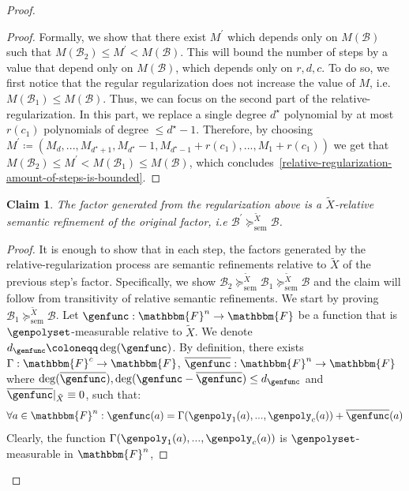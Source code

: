 \documentclass[10pt,a4paper]{article}
\newtheorem{claim}[theorem]{Claim}
\newcommand{\definedas}[0]{\coloneqq}
\newcommand{\basefield}[0]{\mathbbm{F}}
\newcommand{\blocklength}[0]{n}
\newcommand{\field}[0]{\basefield^{\blocklength}}
\newcommand{\degree}[0]{d}
\newcommand{\funcdef}[3]{#1:#2\rightarrow#3}
\newcommand{\restrictfunc}[2]{#1|_{#2}}
\newcommand{\factor}[0]{\mathcal{B}}
\newcommand{\relsemrefineex}[1]{\succeq^{#1}_{\text{sem}}}
\newcommand{\relativeremainder}[1]{\overline{#1}}
\newcommand{\variety}{{\tilde{X}}}
\newcommand{\rankfunc}[0]{{{{r}}}}
\begin{document}
\begin{proof}
\begin{proof}
        Formally, we show that there exist $M^{\prime}$ which depends only on $M(\factor)$ such that $M(\factor_2) \leq M^{\prime} < M(\factor)$.
        This will bound the number of steps by a value that depend only on $M(\factor)$, which depends only on $\rankfunc, \degree, c$.
        To do so, we first notice that the regular regularization does not increase the value of $M$, i.e. $M(\factor_1) \leq M(\factor)$.
        Thus, we can focus on the second part of the relative-regularization.
        In this part, we replace a single degree $\degree^{\star}$ polynomial by at most $\rankfunc(c_1)$ polynomials of degree $\leq \degree^{\star} - 1$.
        Therefore, by choosing $M^{\prime} \definedas (M_{\degree}, ..., M_{\degree^{\star}+1}, M_{\degree^{\star}}-1, M_{\degree^{\star}-1}+\rankfunc(c_1),...,M_1+\rankfunc(c_1))$
        we get that $M(\factor_2) \leq M^{\prime} < M(\factor_1) \leq M(\factor)$, which concludes~\ref{relative-regularization-amount-of-steps-is-bounded}.
    \end{proof}
    \begin{claim}
        The factor generated from the regularization above is a $\variety$-relative semantic refinement of the original factor, i.e $\factor^\prime \relsemrefineex{\variety} \factor$.
    \end{claim}
    \begin{proof}
        It is enough to show that in each step, the factors generated by the relative-regularization process are semantic refinements relative to $\variety$ of the previous step's factor.
        Specifically, we show $\factor_{2} \relsemrefineex{\variety} \factor_{1} \relsemrefineex{\variety} \factor$ and the claim will follow from transitivity of relative semantic refinements.
        \newline
        We start by proving $\factor_1 \relsemrefineex{\variety} \factor$.
        Let $\funcdef{\genfunc}{\field}{\basefield}$ be a function that is $\genpolyset$-measurable relative to $\variety$.
        We denote $\degree_{\genfunc} \definedas \deg(\genfunc)$.
        By definition, there exists $\funcdef{\Gamma}{\basefield^c}{\basefield}$,
        $\funcdef{\relativeremainder{\genfunc}}{\field}{\basefield}$ where $\deg(\relativeremainder{\genfunc}), \deg(\genfunc - \relativeremainder{\genfunc}) \leq \degree_{\genfunc}$ and $\restrictfunc{\relativeremainder{\genfunc}}{\variety} \equiv 0$, such that:
        \[
            \forall a \in \field: \genfunc(a) = \Gamma(\genpoly_1(a),...,\genpoly_c(a)) + \relativeremainder{\genfunc}(a)
        \]
        Clearly, the function $\Gamma(\genpoly_1(a),...,\genpoly_c(a))$ is $\genpolyset$-measurable in $\field$,

\end{proof}
\end{proof}
\end{document}
